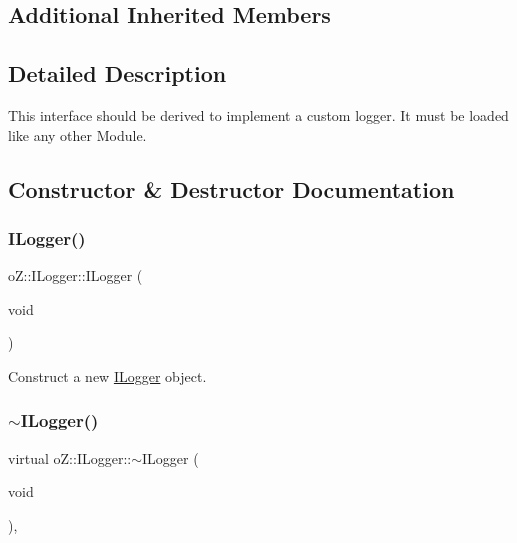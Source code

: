 \subsection*{Additional Inherited Members}


\subsection{Detailed Description}
This interface should be derived to implement a custom logger. It must be loaded like any other Module. 

\subsection{Constructor \& Destructor Documentation}
\mbox{\label{classo_z_1_1_i_logger_a1ef3d8ab6931286af8f13e161520544b}} 
\subsubsection{\texorpdfstring{ILogger()}{ILogger()}}
{\footnotesize\ttfamily o\+Z\+::\+I\+Logger\+::\+I\+Logger (\begin{DoxyParamCaption}\item[{void}]{ }\end{DoxyParamCaption})\hspace{0.3cm}{\ttfamily [default]}}



Construct a new \mbox{\hyperlink{classo_z_1_1_i_logger}{I\+Logger}} object. 

\mbox{\label{classo_z_1_1_i_logger_a5a6f9c60dcd37b014a3621ed39ef6ba6}} 
\subsubsection{\texorpdfstring{$\sim$ILogger()}{~ILogger()}}
{\footnotesize\ttfamily virtual o\+Z\+::\+I\+Logger\+::$\sim$\+I\+Logger (\begin{DoxyParamCaption}\item[{void}]{ }\end{DoxyParamCaption})\hspace{0.3cm}{\ttfamily [virtual]}, {\ttfamily [default]}}



